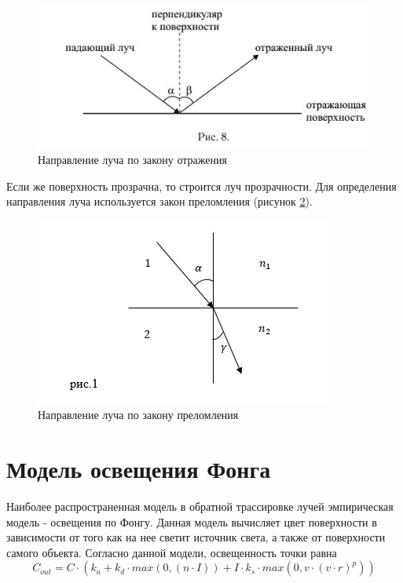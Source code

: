 \begin{figure}[ht!]
	\begin{center}
		\captionsetup{singlelinecheck = false, justification=centerfirst}
		\includegraphics[scale=1]{assets/lomka.jpeg}
		\caption{Направление луча по закону отражения}
		\label{img:lomka}
	\end{center}
	
\end{figure}

Если же поверхность прозрачна, то строится луч прозрачности. Для определения направления луча используется закон преломления (рисунок \ref{img:lomka-2}).

\begin{figure}[ht!]
	\begin{center}
		\captionsetup{singlelinecheck = false, justification=centerfirst}
		\includegraphics[scale=1]{assets/lomka-2.jpeg}
		\caption{Направление луча по закону преломления}
		\label{img:lomka-2}
	\end{center}
	
\end{figure}

\section{Модель освещения Фонга}

Наиболее распространенная модель в обратной трассировке лучей эмпирическая модель - освещения по Фонгу. Данная модель вычисляет цвет поверхности в зависимости от того как на нее светит источник света, а также от поверхности самого объекта. Согласно данной модели, освещенность точки равна 
\begin{equation}
	C_{out} = C \cdot (k_a + k_d \cdot max(0, (n\cdot I)) + I \cdot k_s \cdot max(0, v \cdot (v \cdot r)^p))
\end{equation}


